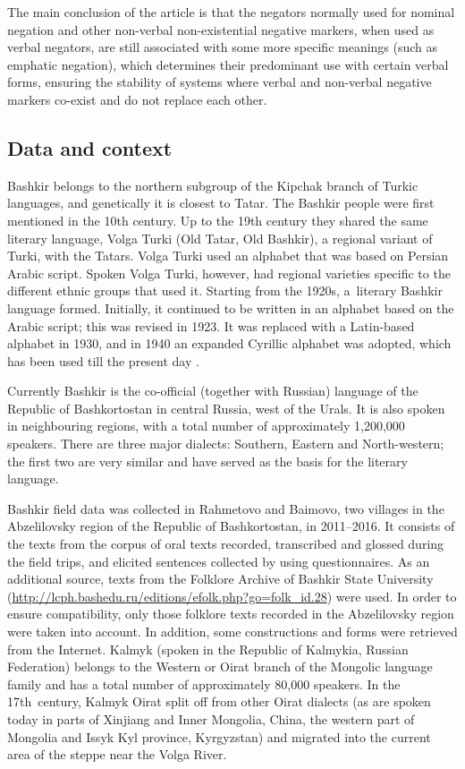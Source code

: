 \documentclass[output=paper]{langsci/langscibook}
\begin{document}
The main conclusion of the article is that the negators normally used for nominal negation and other non-verbal non-existential negative markers, when used as verbal negators, are still associated with some more specific meanings (such as emphatic negation), which determines their predominant use with certain verbal forms, ensuring the stability of systems where verbal and non-verbal negative markers co-exist and do not replace each other.

\subsection{Data and context}\label{sec:BK1.2}

Bashkir belongs to the northern subgroup of the Kipchak branch of Turkic languages, and genetically it is closest to Tatar. The Bashkir people were first mentioned in the 10th century. Up to the 19th century they shared the same literary language, Volga Turki (Old Tatar, Old Bashkir), a regional variant of Turki, with the Tatars. Volga Turki used an alphabet that was based on Persian Arabic script. Spoken Volga Turki, however, had regional varieties specific to the different ethnic groups that used it. Starting from the 1920s, a literary Bashkir language formed. Initially, it continued to be written in an alphabet based on the Arabic script; this was revised in 1923. It was replaced with a Latin-based alphabet in 1930, and in 1940 an expanded Cyrillic alphabet was adopted, which has been used till the present day \citep[11–12]{yuldashev1981a}.

Currently Bashkir is the co-official (together with Russian) language of the Republic of Bashkortostan in central Russia, west of the Urals. It is also spoken in neighbouring regions, with a total number of approximately 1,200,000 speakers. There are three major dialects: Southern, Eastern and North-western; the first two are very similar and have served as the basis for the literary language.

Bashkir field data was collected in Rahmetovo and Baimovo, two villages in the Abzelilovsky region of the Republic of Bashkortostan, in 2011–2016. It consists of the texts from the corpus of oral texts recorded, transcribed and glossed during the field trips, and elicited sentences collected by using questionnaires. As an additional source, texts from the Folklore Archive of Bashkir State University (\url{http://lcph.bashedu.ru/editions/efolk.php?go=folk_id.28}) were used. In order to ensure compatibility, only those folklore texts recorded in the Abzelilovsky region were taken into account. In addition, some constructions and forms were retrieved from the Internet.
Kalmyk (spoken in the Republic of Kalmykia, Russian Federation) belongs to the Western or Oirat branch of the Mongolic language family and has a total number of approximately 80,000 speakers. In the 17th century, Kalmyk Oirat split off from other Oirat dialects (as are spoken today in parts of Xinjiang and Inner Mongolia, China, the western part of Mongolia and Issyk Kyl province, Kyrgyzstan) and migrated into the current area of the steppe near the Volga River.
\end{document}
